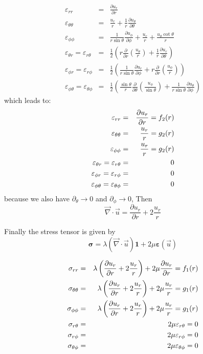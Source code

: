 \begin{eqnarray}
\varepsilon_{rr} 
&=& \frac{\partial u_r}{\partial r} \nonumber\\
\varepsilon_{\theta\theta} 
&=& \frac{u_r}{r} + \frac{1}{r} \frac{\partial u_\theta}{\partial \theta}  \nonumber\\
\varepsilon_{\phi\phi} 
&=& \frac{1}{r \sin\theta} \frac{\partial u_\phi}{\partial \phi} +
\frac{u_r}{r} +\frac{u_\theta \cot \theta}{r} \nonumber\\
\varepsilon_{\theta r} = \varepsilon_{r\theta}   
&=& \frac{1}{2} \left( r \frac{\partial}{\partial r} (\frac{u_\theta}{r} ) 
+\frac{1}{r} \frac{\partial u_r}{\partial \theta} \right) \nonumber\\
\varepsilon_{\phi r} = \varepsilon_{r\phi}      
&=&  \frac{1}{2} \left(  \frac{1}{r \sin\theta} \frac{\partial u_r}{\partial \phi} 
+ r \frac{\partial }{\partial r} (\frac{u_\phi}{r}) \right)  \nonumber\\
\varepsilon_{\phi \theta} = \varepsilon_{\theta\phi} 
&=& \frac{1}{2} \left( \frac{\sin \theta}{r} \frac{\partial }{\partial \theta} (\frac{u_\phi}{\sin\theta}) + \frac{1}{r \sin\theta} \frac{\partial u_\theta}{\partial \phi}    \right) \nonumber
\end{eqnarray}
which leads to:
\begin{eqnarray}
\varepsilon_{rr}  &=& \frac{\partial u_r}{\partial r} =f_2(r) \nonumber\\
\varepsilon_{\theta\theta} &=& \frac{u_r}{r} =g_2(r)  \nonumber\\
\varepsilon_{\phi\phi} &=& \frac{u_r}{r} =g_2(r)  \nonumber\\
\varepsilon_{\theta r} = \varepsilon_{r\theta}   
&=& 0 \nonumber\\ 
\varepsilon_{\phi r} = \varepsilon_{r\phi}      
&=& 0 \nonumber\\ 
\varepsilon_{\phi \theta} = \varepsilon_{\theta\phi} &=& 0 \nonumber
\end{eqnarray}
because we also have $\partial_\theta \rightarrow 0$ and $\partial_\phi \rightarrow 0$,
Then
\[
\vec{\nabla}\cdot\vec{u} = \frac{\partial u_r}{\partial r} + 2 \frac{u_r}{r}
\]


Finally the stress tensor is given by 
\[
{\bm \sigma}=\lambda (\vec{\nabla}\cdot\vec{u}) {\bm 1} +2\mu {\bm \varepsilon}(\vec{u}) 
\]

\begin{eqnarray}
\sigma_{rr} &=&   \lambda \left(  \frac{\partial u_r}{\partial r} + 2 \frac{u_r}{r} \right)
+ 2 \mu \frac{\partial u_r}{\partial r} =f_1(r) \nonumber\\
\sigma_{\theta\theta} &=& \lambda \left(  \frac{\partial u_r}{\partial r} + 2 \frac{u_r}{r} \right)
+ 2 \mu \frac{u_r}{r} =g_1(r)\nonumber\\
\sigma_{\phi\phi} &=&  \lambda \left(  \frac{\partial u_r}{\partial r} + 2 \frac{u_r}{r} \right)
+ 2 \mu \frac{u_r}{r} =g_1(r)\nonumber\\
\sigma_{r\theta} &=& 2\mu \varepsilon_{r\theta} = 0 \nonumber\\ 
\sigma_{r\phi} &=& 2\mu\varepsilon_{r\phi} = 0 \nonumber\\ 
\sigma_{\theta\phi} &=& 2\mu  \varepsilon_{\theta\phi} = 0 \nonumber\\ 
\end{eqnarray}

